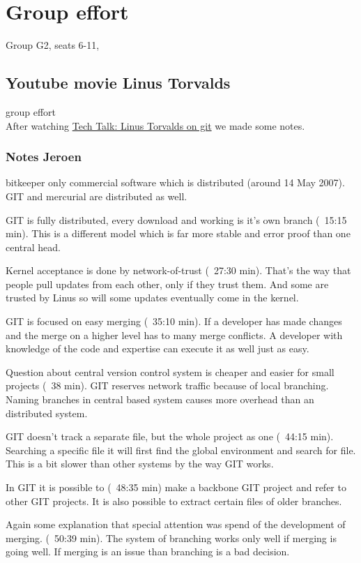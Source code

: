 \chapter{Group effort}

Group G2, seats 6-11,

\section{Youtube movie Linus Torvalds}
group effort\\
After watching \href{https://www.youtube.com/watch?v=4XpnKHJAok8}{Tech Talk: Linus Torvalds on git} we made some notes.

\subsection{Notes Jeroen}
bitkeeper only commercial software which is distributed (around 14 May 2007).
GIT and mercurial are distributed as well.

GIT is fully distributed, every download and working is it's own branch (~15:15 min).
This is a different model which is far more stable and error proof than one central head.

Kernel acceptance is done by network-of-trust (~27:30 min). That's the way that people pull 
updates from each other, only if they trust them. And some are trusted by Linus so will some 
updates eventually come in the kernel.

GIT is focused on easy merging (~35:10 min). If a developer has made changes and the merge 
on a higher level has to many merge conflicts. A developer with knowledge of the code and 
expertise can execute it as well just as easy. 

Question about central version control system is cheaper and easier for small projects 
(~38 min). GIT reserves network traffic because of local branching. Naming branches in central 
based system causes more overhead than an distributed system.

GIT doesn't track a separate file, but the whole project as one (~44:15 min). Searching a 
specific file it will first find the global environment and search for file. This is a bit 
slower than other systems by the way GIT works.

In GIT it is possible to (~48:35 min) make a backbone GIT project and refer to other GIT 
projects. It is also possible to extract certain files of older branches.

Again some explanation that special attention was spend of the development of merging.
(~50:39 min). The system of branching works only well if merging is going well. If merging 
is an issue than branching is a bad decision.

